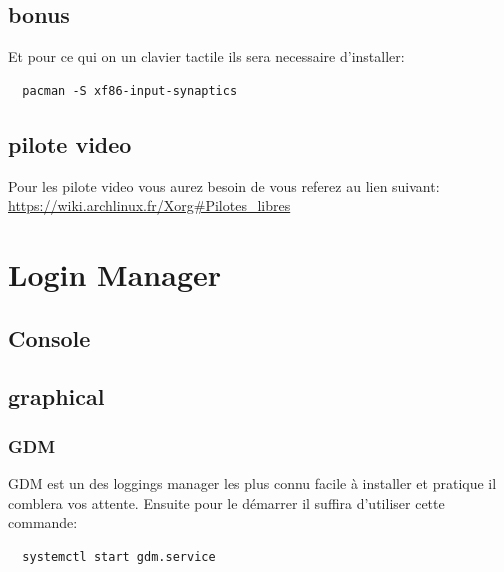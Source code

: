 \documentclass[a4paper]{book}
\begin{document}
\section{bonus}
Et pour ce qui on un clavier tactile ils sera necessaire d'installer\@:
\begin{verbatim}
  pacman -S xf86-input-synaptics
\end{verbatim}
\section{pilote video}
Pour les pilote video vous aurez besoin de vous referez au lien suivant\@:
\url{https://wiki.archlinux.fr/Xorg#Pilotes_libres}
\chapter{Login Manager}
\section{Console}
\section{graphical}
\subsection{GDM}
GDM est un des loggings manager les plus connu facile à installer et pratique
il comblera vos attente.
Ensuite pour le démarrer il suffira d'utiliser cette commande\@:
\begin{verbatim}
  systemctl start gdm.service
\end{verbatim}


\end{document}
